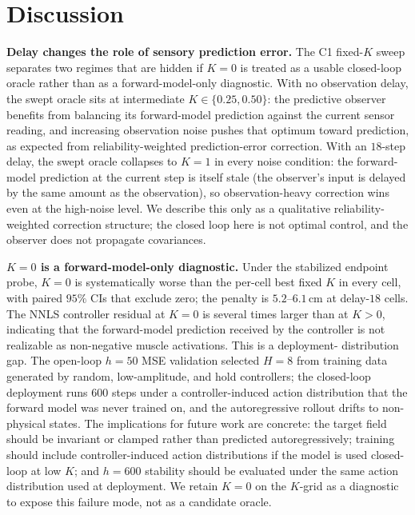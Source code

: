\documentclass[sn-mathphys,NameDate,iicol]{sn-jnl}
\begin{document}
\section{Discussion}
\label{sec:discussion}
\noindent\textbf{Delay changes the role of sensory prediction error.}
The C1 fixed-$K$ sweep separates two regimes that are hidden if
$K\!=\!0$ is treated as a usable closed-loop oracle rather than as a
forward-model-only diagnostic.
With no observation delay, the swept oracle sits at intermediate
$K\!\in\!\{0.25,0.50\}$: the predictive observer benefits from
balancing its forward-model prediction against the current sensor
reading, and increasing observation noise pushes that optimum toward
prediction, as expected from reliability-weighted prediction-error
correction. With an
$18$-step delay, the swept oracle collapses to $K\!=\!1$ in every
noise condition: the forward-model prediction at the current step is
itself stale (the observer's input is delayed by the same amount as
the observation), so observation-heavy correction wins even at the
high-noise level. We describe this only as a qualitative
reliability-weighted correction structure; the closed loop here is not
optimal control, and the observer does not propagate covariances.

\noindent\textbf{$K\!=\!0$ is a forward-model-only diagnostic.}
Under the stabilized endpoint probe, $K\!=\!0$ is systematically
worse than the per-cell best fixed $K$ in every cell, with paired
$95\%$ CIs that exclude zero; the penalty is $5.2\text{--}6.1$\,cm
at delay-$18$ cells. The NNLS controller residual at $K\!=\!0$ is
several times larger than at $K\!>\!0$, indicating that the
forward-model prediction received by the controller is not
realizable as non-negative muscle activations. This is a deployment-%
distribution gap. The open-loop $h\!=\!50$ MSE validation
selected $H{=}8$ from training data generated by random,
low-amplitude, and hold controllers; the closed-loop deployment runs
$600$ steps under a controller-induced action distribution that the forward model was
never trained on, and the autoregressive rollout drifts to
non-physical states. The implications for future work are concrete:
the target field should be invariant or clamped rather than predicted
autoregressively; training should include controller-induced action
distributions if the model is used closed-loop at low $K$; and
$h\!=\!600$ stability should be evaluated under the same action
distribution used at deployment. We retain $K\!=\!0$ on the
$K$-grid as a diagnostic to expose this failure mode, not as a
candidate oracle.
\end{document}
